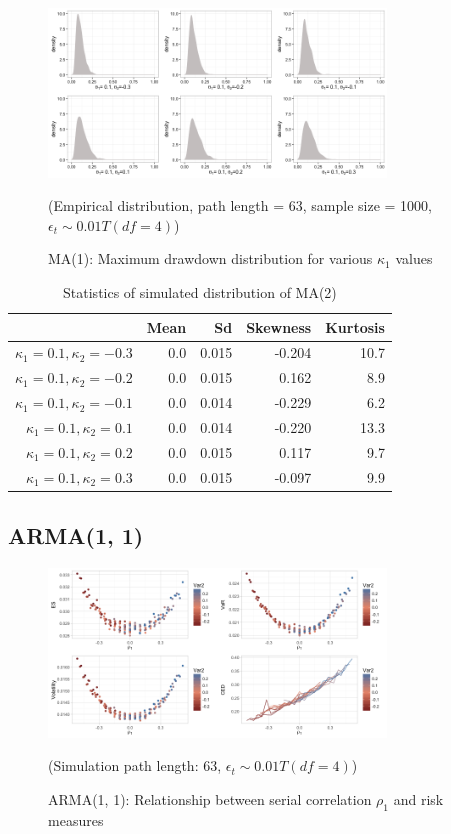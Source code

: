 \documentclass[11pt]{article}
\begin{document}
\begin{figure}[H]
\centering
\includegraphics[width = 0.8\textwidth]{../figures/simulation/T_dist_MA2_maxDrawdown_dist_theta1_01}
\caption{MA(1): Maximum drawdown distribution for various $\kappa_1$ values }
(Empirical distribution, path length = 63, sample size = 1000, $\epsilon_t \sim 0.01T(df = 4)$)
\label{fig:T_dist_MA2_maxDrawdown_dist_theta1_01.png}
\end{figure}

\begin{table}[H]
\centering
\begin{tabular}{|r |r r r r|}
\hline
& Mean & Sd & Skewness & Kurtosis \\
\hline
$\kappa_1 = 0.1, \kappa_2 = -0.3$ & 0.0 & 0.015 & -0.204 & 10.7\\
$\kappa_1 = 0.1, \kappa_2 = -0.2$ & 0.0 & 0.015 & 0.162 & 8.9\\
$\kappa_1 = 0.1, \kappa_2 = -0.1$ & 0.0 & 0.014 & -0.229 & 6.2\\
$\kappa_1 = 0.1, \kappa_2 = 0.1$ & 0.0 & 0.014 & -0.220 & 13.3\\
$\kappa_1 = 0.1, \kappa_2 = 0.2$ & 0.0 & 0.015 & 0.117 & 9.7\\
$\kappa_1 = 0.1, \kappa_2 = 0.3$ & 0.0 & 0.015 & -0.097 & 9.9\\
\hline
\end{tabular}
\caption{Statistics of simulated distribution of MA(2)}
\label{table: T_dist_MA2_return}
\end{table}

\subsection{ARMA(1, 1)}

\begin{figure}[H]
\centering
\includegraphics[width = 0.8\textwidth]{../figures/simulation/T_dist_AR1MA1_risk_measures}
\caption{ARMA(1, 1): Relationship between serial correlation $\rho_1$ and risk measures}
(Simulation path length: 63, $\epsilon_t \sim 0.01T(df = 4)$)
\label{fig:T_dist_AR1MA1_risk_measures}
\end{figure}
\end{document}

